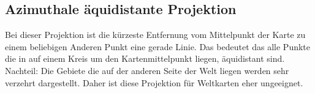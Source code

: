 \subsection{Azimuthale äquidistante Projektion}
\label{sec:azimuequi}
Bei dieser Projektion ist die kürzeste Entfernung vom Mittelpunkt der Karte zu einem beliebigen Anderen Punkt
eine gerade Linie. Das bedeutet das alle Punkte die in auf einem Kreis um den Kartenmittelpunkt liegen, äquidistant sind.
Nachteil:\newline
Die Gebiete die auf der anderen Seite der Welt liegen werden sehr verzehrt dargestellt. Daher ist diese Projektion für Weltkarten 
eher ungeeignet.
\clearpage